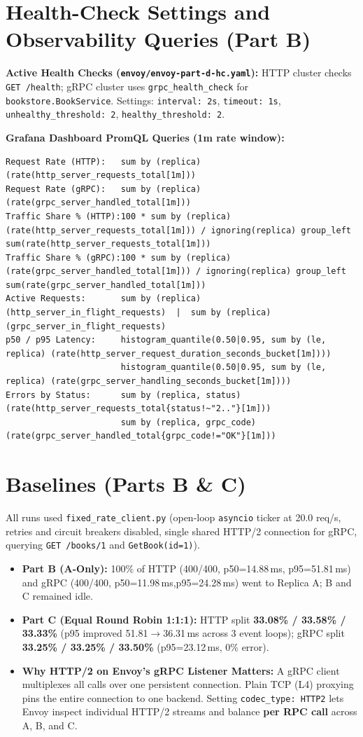 \documentclass[10pt,a4paper]{article}
\begin{document}
\section{Health-Check Settings and Observability Queries (Part B)}
\sloppy
\textbf{Active Health Checks (\texttt{envoy/envoy-part-d-hc.yaml}):} HTTP cluster checks \texttt{GET /health}; gRPC cluster uses \texttt{grpc\_health\_check} for \texttt{bookstore.BookService}. Settings: \texttt{interval: 2s}, \texttt{timeout: 1s}, \texttt{unhealthy\_threshold: 2}, \texttt{healthy\_threshold: 2}.

\textbf{Grafana Dashboard PromQL Queries (1m rate window):}
\begin{lstlisting}
Request Rate (HTTP):   sum by (replica) (rate(http_server_requests_total[1m]))
Request Rate (gRPC):   sum by (replica) (rate(grpc_server_handled_total[1m]))
Traffic Share % (HTTP):100 * sum by (replica) (rate(http_server_requests_total[1m])) / ignoring(replica) group_left sum(rate(http_server_requests_total[1m]))
Traffic Share % (gRPC):100 * sum by (replica) (rate(grpc_server_handled_total[1m])) / ignoring(replica) group_left sum(rate(grpc_server_handled_total[1m]))
Active Requests:       sum by (replica) (http_server_in_flight_requests)  |  sum by (replica) (grpc_server_in_flight_requests)
p50 / p95 Latency:     histogram_quantile(0.50|0.95, sum by (le, replica) (rate(http_server_request_duration_seconds_bucket[1m])))
                       histogram_quantile(0.50|0.95, sum by (le, replica) (rate(grpc_server_handling_seconds_bucket[1m])))
Errors by Status:      sum by (replica, status) (rate(http_server_requests_total{status!~"2.."}[1m]))
                       sum by (replica, grpc_code) (rate(grpc_server_handled_total{grpc_code!="OK"}[1m]))
\end{lstlisting}

\section{Baselines (Parts B \& C)}
All runs used \texttt{fixed\_rate\_client.py} (open-loop \texttt{asyncio} ticker at 20.0 req/s, retries and circuit breakers disabled, single shared HTTP/2 connection for gRPC, querying \texttt{GET /books/1} and \texttt{GetBook(id=1)}).
\begin{itemize}
    \item \textbf{Part B (A-Only):} 100\% of HTTP (400/400, p50=14.88\,ms, p95=51.81\,ms) and gRPC (400/400, p50=11.98\,ms,\linebreak p95=24.28\,ms) went to Replica A; B and C remained idle.
    \item \textbf{Part C (Equal Round Robin 1:1:1):} HTTP split \textbf{33.08\% / 33.58\% / 33.33\%} (p95 improved 51.81$\to$36.31\,ms across 3 event loops); gRPC split \textbf{33.25\% / 33.25\% / 33.50\%} (p95=23.12\,ms, 0\% error).
    \item \textbf{Why HTTP/2 on Envoy's gRPC Listener Matters:} A gRPC client multiplexes all calls over one persistent connection. Plain TCP (L4) proxying pins the entire connection to one backend. Setting \texttt{codec\_type: HTTP2} lets Envoy inspect individual HTTP/2 streams and balance \textbf{per RPC call} across A, B, and C.
\end{itemize}
\end{document}
